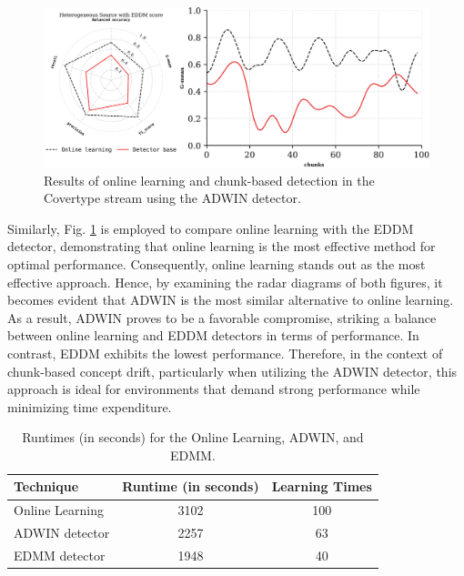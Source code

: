 \begin{figure}[H]
	\centering
	\includegraphics[width=1\linewidth]{6_transfer_learning/figures/exp5.png}
  \caption{Results of online learning and chunk-based detection in the Covertype stream using the ADWIN detector.}
	\label{fig:6_exp7}
\end{figure}
Similarly, Fig. \ref{fig:6_exp7} is employed to compare online learning with the EDDM detector, demonstrating that online learning is the most effective method for optimal performance. Consequently, online learning stands out as the most effective approach. Hence, by examining the radar diagrams of both figures, it becomes evident that ADWIN is the most similar alternative to online learning. As a result, ADWIN proves to be a favorable compromise, striking a balance between online learning and EDDM detectors in terms of performance. In contrast, EDDM exhibits the lowest performance. Therefore, in the context of chunk-based concept drift, particularly when utilizing the ADWIN detector, this approach is ideal for environments that demand strong performance while minimizing time expenditure.

\begin{table}[H]
  \centering
  \caption{Runtimes (in seconds) for the Online Learning, ADWIN, and EDMM.}
  \begin{tabular}{|l|c|c|}
  \hline
  \textbf{Technique}       & \textbf{Runtime (in seconds)} & \textbf{Learning Times} \\ \hline
  Online Learning          & 3102             & 100                     \\ \hline
  ADWIN detector           & 2257             & 63                      \\ \hline
  EDMM detector            & 1948             & 40                      \\ \hline
  \end{tabular}
  \label{table:6_table4}
  \end{table}